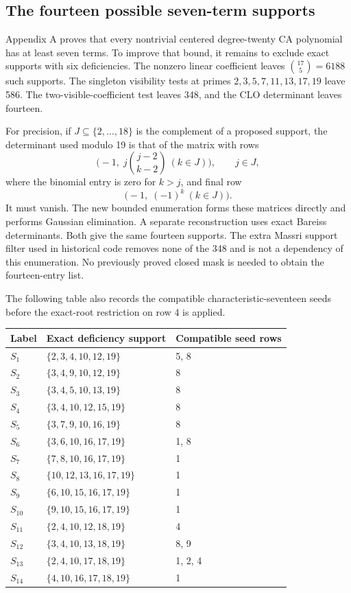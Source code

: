 \documentclass[
  british,
  10pt,
  a4paper,
]{article}
\newcounter{none} %
\begin{document}
\subsection{The fourteen possible seven-term
supports}\label{the-fourteen-possible-seven-term-supports}

Appendix A proves that every nontrivial centered degree-twenty CA
polynomial has at least seven terms. To improve that bound, it remains
to exclude exact supports with six deficiencies. The nonzero linear
coefficient leaves \(\binom{17}{5}=6188\) such supports. The singleton
visibility tests at primes \(2,3,5,7,11,13,17,19\) leave 586. The
two-visible-coefficient test leaves 348, and the CLO determinant leaves
fourteen.

For precision, if \(J\subseteq\{2,\ldots,18\}\) is the complement of a
proposed support, the determinant used modulo 19 is that of the matrix
with rows \[
 \bigl(-1,\;j\binom{j-2}{k-2}\ (k\in J)\bigr),\qquad j\in J,
\] where the binomial entry is zero for \(k>j\), and final row \[
 \bigl(-1,\;(-1)^k\ (k\in J)\bigr).
\] It must vanish. The new bounded enumeration forms these matrices
directly and performs Gaussian elimination. A separate reconstruction
uses exact Bareiss determinants. Both give the same fourteen supports.
The extra Massri support filter used in historical code removes none of
the 348 and is not a dependency of this enumeration. No previously
proved closed mask is needed to obtain the fourteen-entry list.

The following table also records the compatible characteristic-seventeen
seeds before the exact-root restriction on row 4 is applied.

{\def\LTcaptype{none} %
\begin{longtable}[]{@{}lll@{}}
\toprule\noalign{}
Label & Exact deficiency support & Compatible seed rows \\
\midrule\noalign{}
\endhead
\bottomrule\noalign{}
\endlastfoot
\(S_1\) & \(\{2,3,4,10,12,19\}\) & 5, 8 \\
\(S_2\) & \(\{3,4,9,10,12,19\}\) & 8 \\
\(S_3\) & \(\{3,4,5,10,13,19\}\) & 8 \\
\(S_4\) & \(\{3,4,10,12,15,19\}\) & 8 \\
\(S_5\) & \(\{3,7,9,10,16,19\}\) & 8 \\
\(S_6\) & \(\{3,6,10,16,17,19\}\) & 1, 8 \\
\(S_7\) & \(\{7,8,10,16,17,19\}\) & 1 \\
\(S_8\) & \(\{10,12,13,16,17,19\}\) & 1 \\
\(S_9\) & \(\{6,10,15,16,17,19\}\) & 1 \\
\(S_{10}\) & \(\{9,10,15,16,17,19\}\) & 1 \\
\(S_{11}\) & \(\{2,4,10,12,18,19\}\) & 4 \\
\(S_{12}\) & \(\{3,4,10,13,18,19\}\) & 8, 9 \\
\(S_{13}\) & \(\{2,4,10,17,18,19\}\) & 1, 2, 4 \\
\(S_{14}\) & \(\{4,10,16,17,18,19\}\) & 1 \\
\end{longtable}
}
\end{document}
